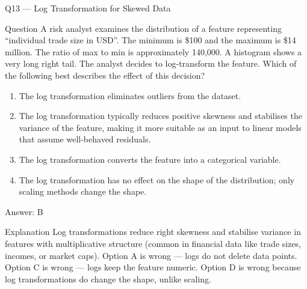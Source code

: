 \documentclass[aspectratio=169,8pt]{beamer}
\begin{document}
	\begin{frame}{Q13 --- Log Transformation for Skewed Data}
		\begin{block}{Question}
			A risk analyst examines the distribution of a feature representing ``individual trade size in USD''. The minimum is \$100 and the maximum is \$14 million. The ratio of max to min is approximately 140,000. A histogram shows a very long right tail. The analyst decides to log-transform the feature. Which of the following best describes the effect of this decision?
		\end{block}
		\begin{enumerate}
			\item The log transformation eliminates outliers from the dataset.
			\item The log transformation typically reduces positive skewness and stabilises the variance of the feature, making it more suitable as an input to linear models that assume well-behaved residuals.
			\item The log transformation converts the feature into a categorical variable.
			\item The log transformation has no effect on the shape of the distribution; only scaling methods change the shape.
		\end{enumerate}
		\begin{exampleblock}{Answer: B}\end{exampleblock}
		\begin{block}{Explanation}
			Log transformations reduce right skewness and stabilise variance in features with multiplicative structure (common in financial data like trade sizes, incomes, or market caps). Option A is wrong --- logs do not delete data points. Option C is wrong --- logs keep the feature numeric. Option D is wrong because log transformations do change the shape, unlike scaling.
		\end{block}
	\end{frame}
	
\end{document}
